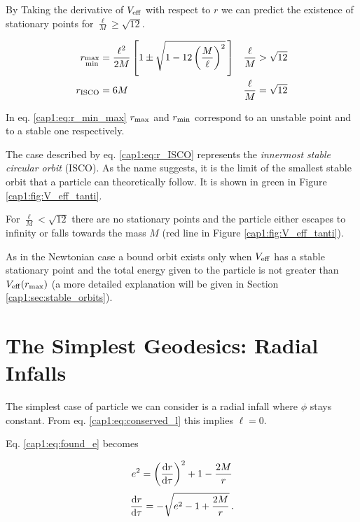 By Taking the derivative of $V_{\rm eff}$ with respect to $r$ we can predict the
existence of stationary points for $\frac{\ell}{M} \geq \sqrt{12}$.

\begin{subequations}
\begin{align}
    r_{\substack{\rm max \\ \rm min}} &= \frac{\ell^2}{2 M} \left[1 \pm
    \sqrt{1 - 12 \left( \frac{M}{\ell} \right)^2} \, \right]
    &&\frac{\ell}{M} > \sqrt{12} \label{cap1:eq:r_min_max} \\
    r_{\rm ISCO} &= 6 M
    &&\frac{\ell}{M} = \sqrt{12} \label{cap1:eq:r_ISCO}
\end{align}
\label{cap1:eq:stationary_r}
\end{subequations}

In eq. \ref{cap1:eq:r_min_max} $r_{\rm max}$ and $r_{\rm min}$ correspond
to an unstable point and to a stable one respectively.

The case described by eq. \ref{cap1:eq:r_ISCO} represents the
\textit{innermost stable circular orbit} (ISCO).
As the name suggests, it is the limit of the smallest stable orbit that a
particle can theoretically follow.
It is shown in green in Figure \ref{cap1:fig:V_eff_tanti}.

For $\frac{\ell}{M} < \sqrt{12}$ there are no stationary points and the particle
either escapes to infinity or falls towards the mass $M$ (red line in Figure
\ref{cap1:fig:V_eff_tanti}).

As in the Newtonian case a bound orbit exists only when $V_{\rm eff}$ has a
stable stationary point and the total energy given to the particle is not
greater than $V_{\rm eff}(r_{\rm max})$ (a more detailed explanation will be given in
Section \ref{cap1:sec:stable_orbits}).


\section{The Simplest Geodesics: Radial Infalls}

The simplest case of particle we can consider is a radial infall where $\phi$
stays constant.
From eq. \ref{cap1:eq:conserved_l} this implies $\ell = 0$.

Eq. \ref{cap1:eq:found_e} becomes


\begin{equation*}
    e^2 = \left(\dv{r}{\tau}\right)^2 + 1 - \frac{2M}{r}
\end{equation*}
\begin{equation}
    \dv{r}{\tau} = - \sqrt{e^2 - 1 + \frac{2 M}{r}} \, .
    \label{cap1:eq:radial_infall_ODE_1}
\end{equation}

